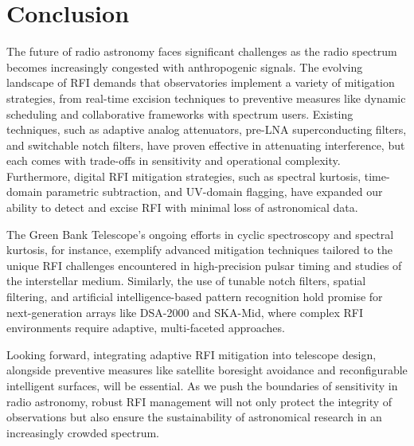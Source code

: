 \section{Conclusion}
\label{section:hardware:conclusion}

The future of radio astronomy faces significant challenges as the radio spectrum becomes increasingly congested with anthropogenic signals. The evolving landscape of RFI demands that observatories implement a variety of mitigation strategies, from real-time excision techniques to preventive measures like dynamic scheduling and collaborative frameworks with spectrum users. Existing techniques, such as adaptive analog attenuators, pre-LNA superconducting filters, and switchable notch filters, have proven effective in attenuating interference, but each comes with trade-offs in sensitivity and operational complexity. Furthermore, digital RFI mitigation strategies, such as spectral kurtosis, time-domain parametric subtraction, and UV-domain flagging, have expanded our ability to detect and excise RFI with minimal loss of astronomical data.

The Green Bank Telescope’s ongoing efforts in cyclic spectroscopy and spectral kurtosis, for instance, exemplify advanced mitigation techniques tailored to the unique RFI challenges encountered in high-precision pulsar timing and studies of the interstellar medium. Similarly, the use of tunable notch filters, spatial filtering, and artificial intelligence-based pattern recognition hold promise for next-generation arrays like DSA-2000 and SKA-Mid, where complex RFI environments require adaptive, multi-faceted approaches.

Looking forward, integrating adaptive RFI mitigation into telescope design, alongside preventive measures like satellite boresight avoidance and reconfigurable intelligent surfaces, will be essential. As we push the boundaries of sensitivity in radio astronomy, robust RFI management will not only protect the integrity of observations but also ensure the sustainability of astronomical research in an increasingly crowded spectrum.